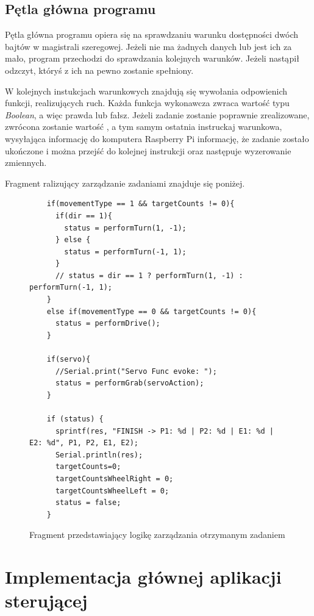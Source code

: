\subsection{Pętla główna programu}

Pętla główna programu opiera się na sprawdzaniu warunku dostępności dwóch bajtów w magistrali szeregowej. Jeżeli nie ma żadnych danych lub jest ich za mało, program przechodzi do sprawdzania kolejnych warunków. Jeżeli nastąpił odzczyt, któryś z ich na pewno zostanie spełniony. 

W kolejnych instukcjach warunkowych znajdują się wywołania odpowienich funkcji, realizujących ruch. Każda funkcja wykonawcza zwraca wartość typu \textit{Boolean}, a więc prawda lub fałsz. Jeżeli zadanie zostanie poprawnie zrealizowane, zwrócona zostanie wartość , a tym samym ostatnia instruckaj warunkowa, wysyłająca informację do komputera Raspberry Pi informację, że zadanie zostało ukończone i można przejść do kolejnej instrukcji oraz następuje wyzerowanie zmiennych. 

Fragment ralizujący zarządzanie zadaniami znajduje się poniżej. 

\begin{figure}[H]
  \centering
  \begin{lstlisting}
    if(movementType == 1 && targetCounts != 0){
      if(dir == 1){
        status = performTurn(1, -1);
      } else {
        status = performTurn(-1, 1);
      }
      // status = dir == 1 ? performTurn(1, -1) : performTurn(-1, 1);
    }
    else if(movementType == 0 && targetCounts != 0){
      status = performDrive();
    }
    
    if(servo){
      //Serial.print("Servo Func evoke: ");
      status = performGrab(servoAction);
    }
  
    if (status) {
      sprintf(res, "FINISH -> P1: %d | P2: %d | E1: %d | E2: %d", P1, P2, E1, E2);
      Serial.println(res);
      targetCounts=0;
      targetCountsWheelRight = 0;
      targetCountsWheelLeft = 0;
      status = false;
    }
  \end{lstlisting}
  \caption{Fragment przedstawiający logikę zarządzania otrzymanym zadaniem}
  \label{fig:manage-ex}
\end{figure}

\clearpage

\section{Implementacja głównej aplikacji sterującej}


